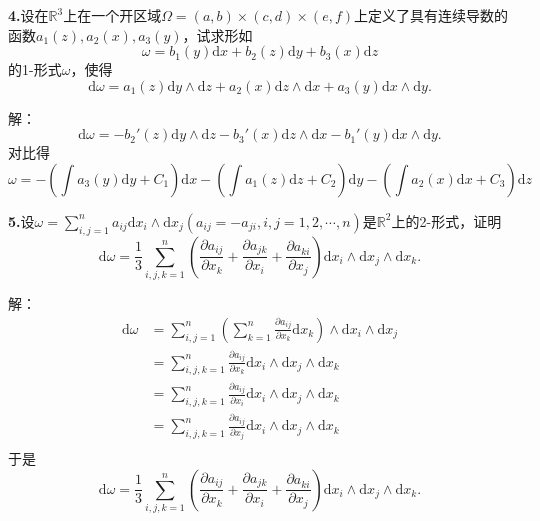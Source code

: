 \documentclass[12pt, a4paper]{article}
\newcommand{\RR}{\mathbb{R}}
\newcommand{\dif}{\mathrm{d}}
\begin{document}
\textbf{4.}设在\(\RR^3\)上在一个开区域\(\Omega = (a, b) \times (c, d) \times (e, f)\)上定义了具有连续导数的函数\(a_1(z), a_2(x), a_3(y)\)，试求形如
\[\omega = b_1(y) \dif x + b_2(z) \dif y + b_3(x) \dif z\]
的1-形式\(\omega\)，使得
\[\dif\omega = a_1(z) \dif y \wedge \dif z + a_2(x) \dif z \wedge \dif x + a_3(y) \dif x \wedge \dif y.\]

解：
\[\dif\omega = -b_2'(z) \dif y \wedge \dif z - b_3'(x) \dif z \wedge \dif x - b_1'(y) \dif x \wedge \dif y.\]
对比得
\[\omega = -\left(\int a_3(y) \dif y + C_1\right) \dif x -\left(\int a_1(z) \dif z + C_2\right) \dif y -\left(\int a_2(x) \dif x + C_3\right) \dif z\]

\textbf{5.}设\(\omega = \sum\limits_{i, j = 1}^{n} a_{ij} \dif x_i \wedge \dif x_j (a_{ij} = -a_{ji}, i, j = 1, 2, \cdots, n)\)是\(\RR^2\)上的2-形式，证明
\[\dif\omega = \frac{1}{3} \sum_{i, j, k = 1}^{n} \left(\frac{\partial a_{ij}}{\partial x_k} + \frac{\partial a_{jk}}{\partial x_i} + \frac{\partial a_{ki}}{\partial x_j}\right) \dif x_i \wedge \dif x_j \wedge \dif x_k.\]

解：
\begin{align*}
\dif\omega &= \sum_{i, j = 1}^{n} \left(\sum_{k = 1}^{n} \frac{\partial a_{ij}}{\partial x_k} \dif x_k\right) \wedge \dif x_i \wedge \dif x_j \\
&= \sum_{i, j, k = 1}^{n} \frac{\partial a_{ij}}{\partial x_k} \dif x_i \wedge \dif x_j \wedge \dif x_k \\
&= \sum_{i, j, k = 1}^{n} \frac{\partial a_{ij}}{\partial x_i} \dif x_i \wedge \dif x_j \wedge \dif x_k \\
&= \sum_{i, j, k = 1}^{n} \frac{\partial a_{ij}}{\partial x_j} \dif x_i \wedge \dif x_j \wedge \dif x_k \\
\end{align*}
于是
\[\dif\omega = \frac{1}{3} \sum_{i, j, k = 1}^{n} \left(\frac{\partial a_{ij}}{\partial x_k} + \frac{\partial a_{jk}}{\partial x_i} + \frac{\partial a_{ki}}{\partial x_j}\right) \dif x_i \wedge \dif x_j \wedge \dif x_k.\]
\end{document}
